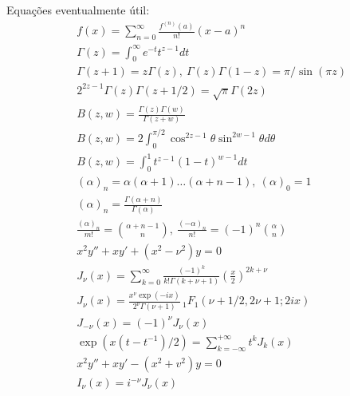 \documentclass[a4paper,12pt, leqno, answers]{exam}
\begin{document}
\thispagestyle{empty}

\newpage
\setcounter{page}{1}
Equa\c{c}\~{o}es eventualmente útil:
\begin{align}
    & f(x) = \sum_{n = 0}^\infty \frac{f^{(n)}(a)}{n!} (x - a)^n \tag{ST} \label{eq:ser_taylor} \\
    & \Gamma(z) = \int_0^\infty e^{-t} t^{z - 1} dt \tag{GE} \label{eq:gamma_euler} \\
    & \Gamma(z + 1) = z \Gamma(z), \ \Gamma(z) \Gamma(1 - z) = \pi / \sin(\pi z) \label{eq:gamma_rel} \\
    & 2^{2 z - 1} \Gamma(z) \Gamma(z + 1/2) = \sqrt{\pi} \Gamma(2 z) \label{eq:gamma_dup_legendre} \\
    & B(z, w) = \frac{\Gamma(z) \Gamma(w)}{\Gamma(z + w)} \tag{BG} \label{eq:beta} \\
    & B(z, w) = 2 \int_0^{\pi / 2} \cos^{2z - 1} \theta \sin^{2w - 1} \theta d\theta \tag{BT} \label{eq:beta_trig} \\
    & B(z, w) = \int_0^1 t^{z - 1} (1 - t)^{w - 1} dt \tag{BI} \label{eq:beta_int} \\
    & (\alpha)_n = \alpha (\alpha + 1) \ldots (\alpha + n - 1), \ (\alpha)_0 = 1 \tag{SP} \label{eq:sim_poch} \\
    & (\alpha)_n = \frac{\Gamma(\alpha + n)}{\Gamma(\alpha)} \label{eq:sim_poch_gamma} \\
    & \frac{(\alpha)_n}{m!} = \binom{\alpha + n - 1}{n}, \ \frac{(-\alpha)_n}{n!} = (-1)^n \binom{\alpha}{n} \label{eq:sim_poch_binom} \\
    & x^2 y'' + x y' + (x^2 - \nu^2) y = 0 \tag{FB} \label{eq:bessel} \\
    & J_\nu(x) = \sum_{k = 0}^\infty \frac{(-1)^k}{k! \Gamma(k + \nu + 1)} \left( \frac{x}{2} \right)^{2k + \nu} \label{eq:bessel_pri_esp} \\
    & J_\nu(x) = \frac{x^\nu \exp(-i x)}{2^\nu \Gamma(\nu + 1)} \,_1F_1(\nu + 1/2, 2\nu + 1; 2 i x) \label{eq:bessel_pri_esp_hiperg_con} \\
    & J_{-\nu}(x) = (-1)^\nu J_\nu(x) \label{eq:bessel_prim_esp_neg} \\
    & \exp(x (t - t^{-1}) / 2) = \sum_{k = -\infty}^{+\infty} t^k J_k(x) \tag{GFB} \label{eq:bessel_pri_esp_geratriz} \\
    & x^2 y'' + x y' - (x^2 + v^2) y = 0 \tag{FBM} \label{eq:bessel_mod} \\
    & I_\nu(x) = i^{-\nu} J_\nu(x) \label{eq:bessel_mod_pri_esp}

\end{align}
\end{document}

